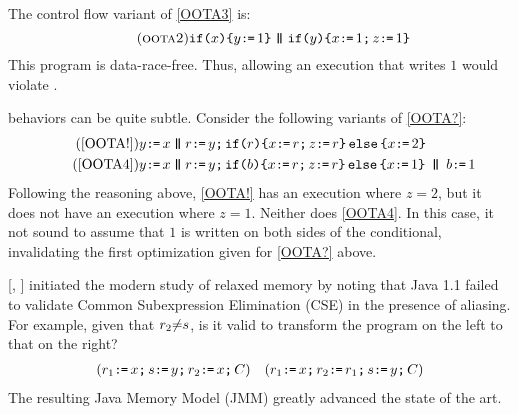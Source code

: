 The control flow variant of \ref{OOTA3} is:
\begin{displaymath}
  \label{cyc}\tag{\textsc{oota2}}
  \IF{x}\THEN y\GETS 1 \FI \!\PAR\! \IF{y}\THEN x\GETS 1 \SEMI z\GETS 1\FI
\end{displaymath}
This program is data-race-free. Thus, allowing an execution that writes $1$
would violate \drfsc{}.


\oota{} behaviors can be quite subtle.
Consider the following variants of \eqref{OOTA?}:
\begin{align}
  \tag{\ref{OOTA!}}
    y\GETS x
  \PAR&
  r\GETS y\SEMI \IF{r}\THEN 
  x\GETS r\SEMI z\GETS r \ELSE x\GETS2 \FI
  \\
  \tag{\ref{OOTA4}}
  y\GETS x
  \PAR&
  r\GETS y \SEMI \IF{b}\THEN  x\GETS r \SEMI z\GETS r \ELSE x\GETS1 \FI
  \PAR
  b\GETS1
\end{align}
Following the reasoning above, \ref{OOTA!} has an execution where
$z{=}2$, but it does not have an execution where $z{=}1$.   Neither does
\ref{OOTA4}.  In this case, it not sound to assume that  $1$ is
written on both sides of the conditional, invalidating the first optimization
given for \eqref{OOTA?} above.
  




\citeauthor{DBLP:conf/java/Pugh99} [\citeyear{DBLP:conf/java/Pugh99},
] initiated the modern study of relaxed memory by noting that
Java 1.1 failed to validate Common Subexpression Elimination (CSE) in the
presence of aliasing. For example, given that $r_2{\neq}s$, is it valid
to transform the program on the left to that on the right?
\begin{align*}
  ({r_1\texttt{:}\mkern-1mu\texttt{=}\, x \texttt{;}\,\allowbreak
  s\texttt{:}\mkern-1mu\texttt{=}\, y \texttt{;}\,\allowbreak  
  r_2\texttt{:}\mkern-1mu\texttt{=}\, x\texttt{;}\,\allowbreak C})
&&
  ({r_1\texttt{:}\mkern-1mu\texttt{=}\, x \texttt{;}\,\allowbreak     
    r_2\texttt{:}\mkern-1mu\texttt{=}\, r_1\texttt{;}\,\allowbreak
    s\texttt{:}\mkern-1mu\texttt{=}\, y \texttt{;}\,\allowbreak C})
\end{align*}
The resulting Java Memory Model (JMM) \cite{Manson:2005:JMM:1047659.1040336}
greatly advanced the state of the art.


